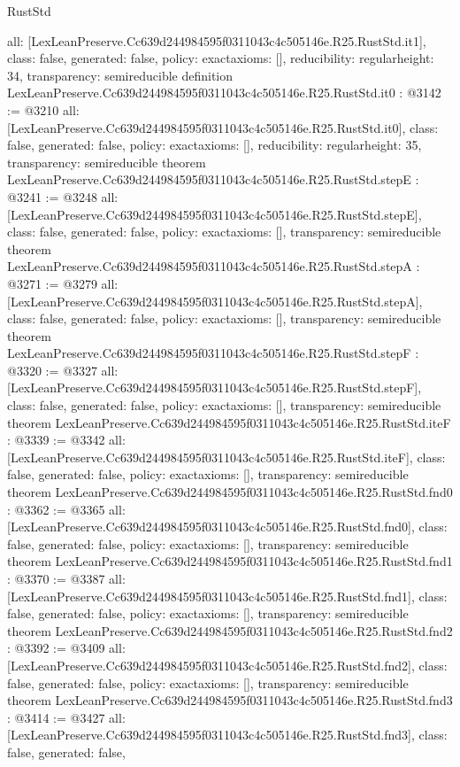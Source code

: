 \begin{lexlean}{RustStd}
\begin{coremodule}
{  all: [LexLeanPreserve.Cc639d244984595f0311043c4c505146e.R25.RustStd.it1],
  class: false,
  generated: false,
  policy: exact{axioms: []},
  reducibility: regular{height: 34},
  transparency: semireducible
}
definition LexLeanPreserve.Cc639d244984595f0311043c4c505146e.R25.RustStd.it0 : @3142 := @3210 {
  all: [LexLeanPreserve.Cc639d244984595f0311043c4c505146e.R25.RustStd.it0],
  class: false,
  generated: false,
  policy: exact{axioms: []},
  reducibility: regular{height: 35},
  transparency: semireducible
}
theorem LexLeanPreserve.Cc639d244984595f0311043c4c505146e.R25.RustStd.stepE : @3241 := @3248 {
  all: [LexLeanPreserve.Cc639d244984595f0311043c4c505146e.R25.RustStd.stepE],
  class: false,
  generated: false,
  policy: exact{axioms: []},
  transparency: semireducible
}
theorem LexLeanPreserve.Cc639d244984595f0311043c4c505146e.R25.RustStd.stepA : @3271 := @3279 {
  all: [LexLeanPreserve.Cc639d244984595f0311043c4c505146e.R25.RustStd.stepA],
  class: false,
  generated: false,
  policy: exact{axioms: []},
  transparency: semireducible
}
theorem LexLeanPreserve.Cc639d244984595f0311043c4c505146e.R25.RustStd.stepF : @3320 := @3327 {
  all: [LexLeanPreserve.Cc639d244984595f0311043c4c505146e.R25.RustStd.stepF],
  class: false,
  generated: false,
  policy: exact{axioms: []},
  transparency: semireducible
}
theorem LexLeanPreserve.Cc639d244984595f0311043c4c505146e.R25.RustStd.iteF : @3339 := @3342 {
  all: [LexLeanPreserve.Cc639d244984595f0311043c4c505146e.R25.RustStd.iteF],
  class: false,
  generated: false,
  policy: exact{axioms: []},
  transparency: semireducible
}
theorem LexLeanPreserve.Cc639d244984595f0311043c4c505146e.R25.RustStd.fnd0 : @3362 := @3365 {
  all: [LexLeanPreserve.Cc639d244984595f0311043c4c505146e.R25.RustStd.fnd0],
  class: false,
  generated: false,
  policy: exact{axioms: []},
  transparency: semireducible
}
theorem LexLeanPreserve.Cc639d244984595f0311043c4c505146e.R25.RustStd.fnd1 : @3370 := @3387 {
  all: [LexLeanPreserve.Cc639d244984595f0311043c4c505146e.R25.RustStd.fnd1],
  class: false,
  generated: false,
  policy: exact{axioms: []},
  transparency: semireducible
}
theorem LexLeanPreserve.Cc639d244984595f0311043c4c505146e.R25.RustStd.fnd2 : @3392 := @3409 {
  all: [LexLeanPreserve.Cc639d244984595f0311043c4c505146e.R25.RustStd.fnd2],
  class: false,
  generated: false,
  policy: exact{axioms: []},
  transparency: semireducible
}
theorem LexLeanPreserve.Cc639d244984595f0311043c4c505146e.R25.RustStd.fnd3 : @3414 := @3427 {
  all: [LexLeanPreserve.Cc639d244984595f0311043c4c505146e.R25.RustStd.fnd3],
  class: false,
  generated: false,
}
\end{coremodule}
\end{lexlean}
